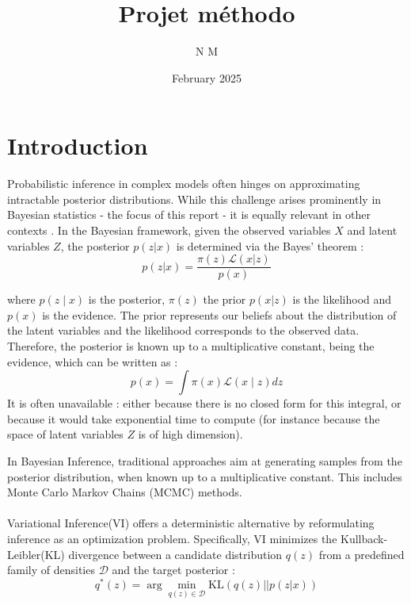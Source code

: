 \documentclass{article}
\title{Projet méthodo}
\author{N M}
\date{February 2025}
\begin{document}
\maketitle
\tableofcontents

\newpage

\section{Introduction}
 

Probabilistic inference in complex models often hinges on approximating intractable posterior distributions. While this challenge arises prominently in Bayesian statistics - the focus of this report - it is equally relevant in other contexts . 
In the Bayesian framework, given the observed variables $X$ and latent variables $Z$, the posterior $p(z|x)$ is determined via the Bayes' theorem : 
\begin{equation}
    p(z|x) = \frac{\pi(z)\mathcal{L}(x|z)}{p(x)}
\end{equation}

where $p(z\mid x)$ is the posterior, $\pi(z)$ the prior $p(x|z)$ is the likelihood and $p(x)$ is the evidence. 
The prior represents our beliefs about the distribution of the latent variables and the likelihood corresponds to the observed data. Therefore, the posterior is known up to a multiplicative constant, being the evidence, which can be written as : 
\begin{equation}
    p(x)= \int \pi(x)\mathcal{L}(x \mid z) dz
\end{equation}
It is often unavailable : either because there is no closed form for this integral, or because it would take exponential time to compute (for instance because the space of latent variables $Z$ is of high dimension). 

In Bayesian Inference, traditional approaches aim at generating samples from the posterior distribution, when known up to a multiplicative constant. This includes Monte Carlo Markov Chains  (MCMC) methods. 
\\
\\
Variational Inference(VI) offers a deterministic alternative by reformulating inference as an optimization problem. Specifically, VI minimizes the Kullback-Leibler(KL) divergence between a candidate distribution $q(z)$ from a predefined family of densities $\mathscr{D} $  and the target posterior : 
\begin{equation}
    q^*(z) =  \arg\min_ {q(z) \in \mathscr{D} } {\text{KL}(q(z)||p(z|x))}
\end{equation}
\end{document}
